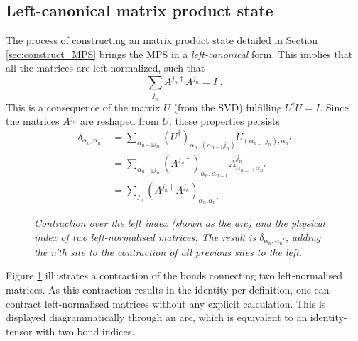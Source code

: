\subsection{Left-canonical matrix product state}
The process of constructing an matrix product state detailed in Section \ref{sec:construct_MPS} brings the MPS in a \textit{left-canonical} form. This implies that all the matrices are left-normalized, such that
\begin{equation}
	\sum_{j_n} A^{j_n \dag} A^{j_n} = I \; .
	\label{eq:LC_ident}
\end{equation}
This is a consequence of the matrix $U$ (from the SVD) fulfilling $U^{\dag}U = I$. Since the matrices $A^{j_n}$ are reshaped from $U$, these properties persists
\begin{align*}
	\delta_{\alpha_n , \alpha_n'} &= \sum_{\alpha_{n-1} j_n} (U^{\dag})_{\alpha_n , (\alpha_{n-1} j_n)} U_{(\alpha_{n-1} j_n), \alpha_n'} \\
	 &= \sum_{\alpha_{n-1} j_n} (A^{j_n \dag})_{\alpha_n , \alpha_{n-1}} A_{\alpha_{n-1}, \alpha_n'}^{j_n} \\
	 &= \sum_{j_n} \left( A^{j_n \dag} A^{j_n} \right)_{\alpha_{n} . \alpha_n'}
\end{align*} 
\begin{figure}[h!]
	\centering
	
	\caption{\textit{Contraction over the left index (shown as the arc) and the physical index of two left-normalised matrices. The result is $\delta_{\alpha_n , \alpha_n'}$, adding the n'th site to the contraction of all previous sites to the left.}}
	\label{fig:leftNorm}
\end{figure}
Figure \ref{fig:leftNorm} illustrates a contraction of the bonds connecting two left-normalised matrices. As this contraction results in the identity per definition, one can contract left-normalised matrices without any explicit calculation. This is displayed diagrammatically through an arc, which is equivalent to an identity-tensor with two bond indices. 


